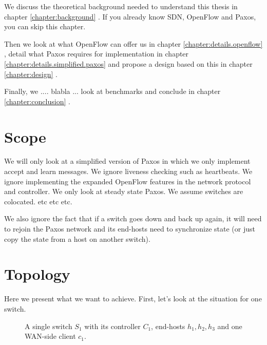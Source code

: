 We discuss the theoretical background needed to understand this thesis in
chapter \ref{chapter:background} .  If you already know \acs{SDN},
OpenFlow and Paxos, you can skip this chapter.

Then we look at what OpenFlow can offer us in chapter
\ref{chapter:details.openflow}
, detail what Paxos requires for
implementation in chapter \ref{chapter:details.simplified.paxos} 
 and propose a
design based on this in chapter \ref{chapter:design} .

Finally, we .... blabla ... look at benchmarks and conclude in chapter
\ref{chapter:conclusion} .

\section{Scope}


We will only look at a simplified version of Paxos in which we only
implement accept and learn messages. We ignore liveness checking such as
heartbeats. We ignore implementing the expanded OpenFlow features in the
network protocol and controller. We only look at steady state Paxos.
We assume switches are colocated. etc etc etc.

We also ignore the fact that if a switch goes down and back up again, it
will need to rejoin the Paxos network and its end-hosts need to synchronize
state (or just copy the state from a host on another switch).

\section{Topology}


Here we present what we want to achieve.  First, let's look at the situation
for one switch.

\begin{figure}[H]
  \centering
  \caption{A single switch $S_1$ with its controller $C_1$, end-hosts
    $h_1, h_2, h_3$ and one WAN-side client $c_1$.}
  \label{figure:graph.single.switch}
\end{figure}

